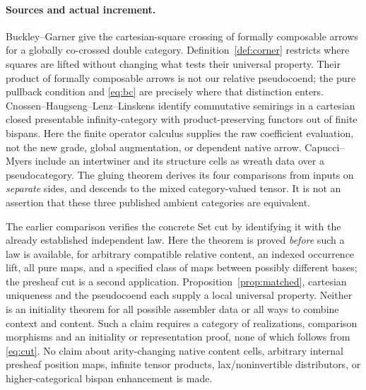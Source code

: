 \documentclass[11pt]{article}
\theoremstyle{definition}\newtheorem{definition}[theorem]{Definition}
\begin{document}
\paragraph{Sources and actual increment.}
Buckley--Garner \cite[Secs.~3,6, esp.\ Prop.~6.3]{BG} give the
cartesian-square crossing of formally composable arrows for a globally
co-crossed double category. Definition~\ref{def:corner} restricts
where squares are lifted without changing what tests their universal
property. Their product of formally composable arrows is not our
relative pseudocoend; the pure pullback condition and \eqref{eq:bc}
are precisely where that distinction enters. Cnossen--Haugseng--Lenz--Linskens
\cite[Thm.~A]{CHLL} identify commutative semirings in a cartesian
closed presentable infinity-category with product-preserving functors
out of finite bispans. Here the finite operator calculus supplies
the raw coefficient evaluation, not the new grade, global augmentation,
or dependent native arrow. Capucci--Myers \cite[App.~D, Def.~D.9]{CM}
include an intertwiner and its structure cells as wreath data over a
pseudocategory. The gluing theorem derives its four comparisons
from inputs on \emph{separate} sides, and descends to the mixed
category-valued tensor. It is not an assertion that these three
published ambient categories are equivalent.

The earlier comparison \cite{C} verifies the concrete Set cut by
identifying it with the already established independent law. Here
the theorem is proved \emph{before} such a law is available, for
arbitrary compatible relative content, an indexed occurrence lift,
all pure maps, and a specified class of maps between possibly
different bases; the presheaf cut is a second application.
Proposition~\ref{prop:matched}, cartesian uniqueness and the pseudocoend each supply a local
universal property. Neither is an initiality theorem for all possible
assembler data or all ways to combine context and content. Such a
claim requires a category of realizations, comparison morphisms
and an initiality or representation proof, none of which follows
from \eqref{eq:cut}. No claim about arity-changing native content
cells, arbitrary internal presheaf position maps, infinite tensor
products, lax/noninvertible distributors, or higher-categorical
bispan enhancement is made.
\end{document}
